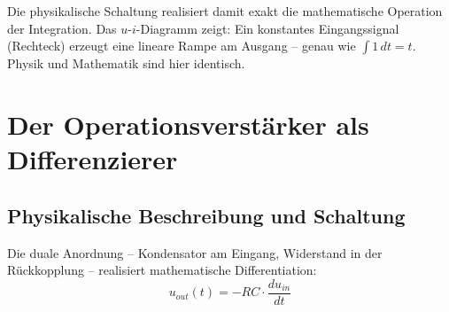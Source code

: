 ﻿\documentclass[12pt, a4paper]{article}
\begin{document}
	Die physikalische Schaltung realisiert damit exakt die mathematische Operation der Integration. Das $u$-$i$-Diagramm zeigt: Ein konstantes Eingangssignal (Rechteck) erzeugt eine lineare Rampe am Ausgang -- genau wie $\int 1\,dt = t$. Physik und Mathematik sind hier identisch.
	
	\section{Der Operationsverstärker als Differenzierer}
	
	\subsection{Physikalische Beschreibung und Schaltung}
	
	Die duale Anordnung -- Kondensator am Eingang, Widerstand in der Rückkopplung -- realisiert mathematische Differentiation:
	\begin{equation}
		u_{out}(t) = -RC \cdot \frac{du_{in}}{dt}
	\end{equation}
	
\end{document}
